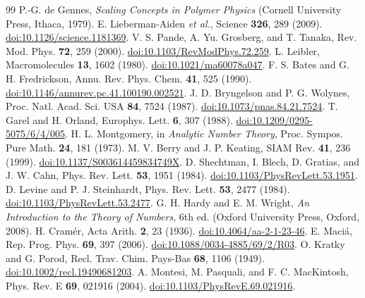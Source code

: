 \documentclass[11pt]{article}
\begin{document}
\begin{thebibliography}{99}
 P.-G. de Gennes, \emph{Scaling Concepts in Polymer Physics}
(Cornell University Press, Ithaca, 1979).
 E. Lieberman-Aiden \emph{et al.}, Science \textbf{326}, 289 (2009). \href{https://doi.org/10.1126/science.1181369}{doi:10.1126/science.1181369}.
 V. S. Pande, A. Yu. Grosberg, and T. Tanaka, Rev. Mod. Phys. \textbf{72}, 259 (2000). \href{https://doi.org/10.1103/RevModPhys.72.259}{doi:10.1103/RevModPhys.72.259}.
 L. Leibler, Macromolecules \textbf{13}, 1602 (1980). \href{https://doi.org/10.1021/ma60078a047}{doi:10.1021/ma60078a047}.
 F. S. Bates and G. H. Fredrickson, Annu. Rev. Phys. Chem. \textbf{41}, 525 (1990). \href{https://doi.org/10.1146/annurev.pc.41.100190.002521}{doi:10.1146/annurev.pc.41.100190.002521}.
 J. D. Bryngelson and P. G. Wolynes, Proc. Natl. Acad. Sci. USA \textbf{84}, 7524 (1987). \href{https://doi.org/10.1073/pnas.84.21.7524}{doi:10.1073/pnas.84.21.7524}.
 T. Garel and H. Orland, Europhys. Lett. \textbf{6}, 307 (1988). \href{https://doi.org/10.1209/0295-5075/6/4/005}{doi:10.1209/0295-5075/6/4/005}.
 H. L. Montgomery, in \emph{Analytic Number Theory}, Proc. Sympos. Pure Math. \textbf{24}, 181 (1973).
 M. V. Berry and J. P. Keating, SIAM Rev. \textbf{41}, 236 (1999). \href{https://doi.org/10.1137/S003614459834749X}{doi:10.1137/S003614459834749X}.
 D. Shechtman, I. Blech, D. Gratias, and J. W. Cahn, Phys. Rev. Lett. \textbf{53}, 1951 (1984). \href{https://doi.org/10.1103/PhysRevLett.53.1951}{doi:10.1103/PhysRevLett.53.1951}.
 D. Levine and P. J. Steinhardt, Phys. Rev. Lett. \textbf{53}, 2477 (1984). \href{https://doi.org/10.1103/PhysRevLett.53.2477}{doi:10.1103/PhysRevLett.53.2477}.
 G. H. Hardy and E. M. Wright, \emph{An Introduction to the Theory of Numbers}, 6th ed. (Oxford University Press, Oxford, 2008).
 H. Cram\'er, Acta Arith. \textbf{2}, 23 (1936). \href{https://doi.org/10.4064/aa-2-1-23-46}{doi:10.4064/aa-2-1-23-46}.
 E. Maci\'a, Rep. Prog. Phys. \textbf{69}, 397 (2006). \href{https://doi.org/10.1088/0034-4885/69/2/R03}{doi:10.1088/0034-4885/69/2/R03}.
 O. Kratky and G. Porod, Recl. Trav. Chim. Pays-Bas \textbf{68}, 1106 (1949). \href{https://doi.org/10.1002/recl.19490681203}{doi:10.1002/recl.19490681203}.
 A. Montesi, M. Pasquali, and F. C. MacKintosh, Phys. Rev. E \textbf{69}, 021916 (2004). \href{https://doi.org/10.1103/PhysRevE.69.021916}{doi:10.1103/PhysRevE.69.021916}.

\end{thebibliography}
\end{document}
